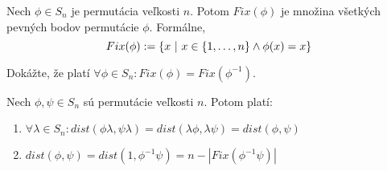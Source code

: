\begin{definition}
Nech $\phi \in S_n$ je permutácia veľkosti $n$. 
Potom $Fix(\phi)$ je množina všetkých pevných bodov permutácie $\phi$. 
Formálne, 
$$Fix(\phi) := \left\{x ~|~ x \in \left\{1, \ldots, n\right\} \wedge \phi(x) = x\right\}$$ 
\end{definition}

\begin{toreview}
\begin{exercise}
Dokážte, že platí $\forall \phi \in S_n: Fix(\phi) = Fix(\phi^{-1})$.
\end{exercise}
\end{toreview}


\begin{theorem}
\label{thm:permdist}
Nech $\phi, \psi \in S_n$ sú permutácie veľkosti $n$. Potom platí:

\begin{enumerate}
    \item $\forall \lambda \in S_n: dist(\phi \lambda, \psi \lambda) = dist(\lambda \phi, \lambda \psi) = dist(\phi, \psi)$ 
    \item $dist(\phi, \psi) = dist(1, \phi^{-1} \psi) = n - |Fix(\phi^{-1} \psi)|$
\end{enumerate}
\end{theorem}
